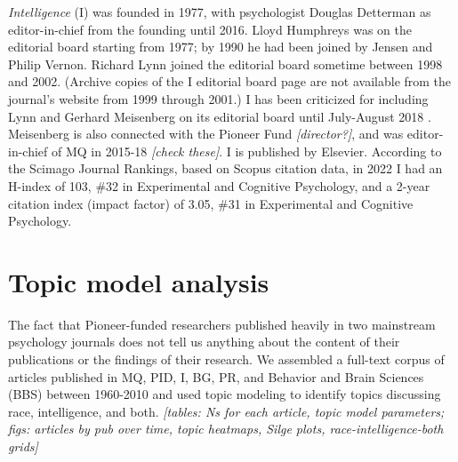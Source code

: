 \documentclass[12pt]{article}
\begin{document}
\emph{Intelligence} (I) was founded in 1977, with psychologist Douglas
Detterman as editor-in-chief from the founding until 2016. Lloyd
Humphreys was on the editorial board starting from 1977; by 1990 he had
been joined by Jensen and Philip Vernon. Richard Lynn joined the
editorial board sometime between 1998 and 2002. (Archive copies of the I
editorial board page are not available from the journal's website from
1999 through 2001.) I has been criticized for including Lynn and Gerhard
Meisenberg on its editorial board until July-August 2018
\cite{SainiSuperiorReturnRace2019}. Meisenberg is also connected with
the Pioneer Fund \emph{{[}director?{]}}, and was editor-in-chief of MQ
in 2015-18 \emph{{[}check these{]}}. I is published by Elsevier.
According to the Scimago Journal Rankings, based on Scopus citation
data, in 2022 I had an H-index of 103, \#32 in Experimental and
Cognitive Psychology, and a 2-year citation index (impact factor) of
3.05, \#31 in Experimental and Cognitive Psychology.

\hypertarget{topic-model-analysis}{%
\section*{Topic model analysis}\label{topic-model-analysis}}

The fact that Pioneer-funded researchers published heavily in two
mainstream psychology journals does not tell us anything about the
content of their publications or the findings of their research. We
assembled a full-text corpus of articles published in MQ, PID, I, BG,
PR, and Behavior and Brain Sciences (BBS) between 1960-2010 and used
topic modeling to identify topics discussing race, intelligence, and
both. \emph{{[}tables: Ns for each article, topic model parameters;
figs: articles by pub over time, topic heatmaps, Silge plots,
race-intelligence-both grids{]}}
\end{document}
